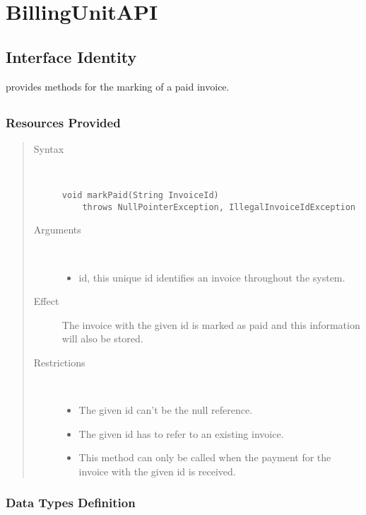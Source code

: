 \section{BillingUnitAPI}
\label{api:billing-unit-api}

\subsection{Interface Identity}

\npar {} provides methods for the marking of a paid
invoice.

\subsection{}

\subsubsection{Resources Provided}

\begin{quote}
	\begin{description}
		\item[Syntax] \
		\begin{verbatim}
void markPaid(String InvoiceId)
    throws NullPointerException, IllegalInvoiceIdException
		\end{verbatim}
		\item[Arguments] \
		\begin{itemize}
		  \item id, this unique id identifies an invoice throughout the system.
		\end{itemize}
		\item[Effect] The invoice with the given id is marked as paid and this
		information will also be stored. 
		\item[Restrictions] \
		\begin{itemize}
		  \item The given id can't be the null reference.
		  \item The given id has to refer to an existing invoice.
		  \item This method can only be called when the payment for the invoice with
		  the given id is received.
		\end{itemize}
	\end{description} 
\end{quote}

\subsubsection{Data Types Definition}

